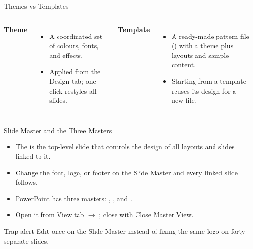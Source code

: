 \documentclass[aspectratio=169]{beamer}
\begin{document}
\begin{frame}{Themes vs Templates}
  \begin{columns}[T]
      \textbf{Theme}
      \begin{itemize}
        \item A coordinated set of colours, fonts, and effects.
        \item Applied from the Design tab; one click restyles all slides.
      \end{itemize}
      \textbf{Template}
      \begin{itemize}
        \item A ready-made pattern file () with a theme plus
          layouts and sample content.
        \item Starting from a template reuses its design for a new file.
      \end{itemize}
  \end{columns}
  \vspace{0.3cm}
\end{frame}

\begin{frame}{Slide Master and the Three Masters}
  \begin{itemize}
    \item The  is the top-level slide that controls the
      design of all layouts and slides linked to it.
    \item Change the font, logo, or footer on the Slide Master and every
      linked slide follows.
    \item PowerPoint has three masters: , , and .
    \item Open it from View tab $\rightarrow$ ; close with
      Close Master View.
  \end{itemize}
  \begin{alertblock}{Trap alert}
    Edit once on the Slide Master instead of fixing the same logo on forty
    separate slides.
  \end{alertblock}
\end{frame}
\end{document}
